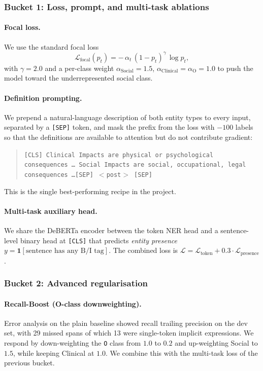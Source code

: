 \documentclass[11pt]{article}
\begin{document}
\subsubsection{Bucket 1: Loss, prompt, and multi-task ablations}

\paragraph{Focal loss.} We use the standard focal loss
\citep{lin2017focal}
\[
\mathcal{L}_{\text{focal}}(p_t) = -\,\alpha_t\,(1 - p_t)^{\gamma}\,\log p_t,
\]
with $\gamma = 2.0$ and a per-class weight $\alpha_{\text{Social}} = 1.5$,
$\alpha_{\text{Clinical}} = \alpha_{\text{O}} = 1.0$ to push the model
toward the underrepresented social class.

\paragraph{Definition prompting.} We prepend a natural-language
description of both entity types to every input, separated by a
\texttt{[SEP]} token, and mask the prefix from the loss with
$-100$ labels so that the definitions are available to attention but do
not contribute gradient:
\begin{quote}\small
\texttt{[CLS] Clinical Impacts are physical or psychological consequences \ldots
Social Impacts are social, occupational, legal consequences \ldots [SEP]
$<$post$>$ [SEP]}
\end{quote}
This is the single best-performing recipe in the project.

\paragraph{Multi-task auxiliary head.} We share the DeBERTa encoder
between the token NER head and a sentence-level binary head at
\texttt{[CLS]} that predicts \emph{entity presence}
$y = \mathbf{1}[\text{sentence has any B/I tag}]$. The combined loss is
$\mathcal{L} = \mathcal{L}_{\text{token}} +
0.3\cdot\mathcal{L}_{\text{presence}}$.

\subsubsection{Bucket 2: Advanced regularisation}

\paragraph{Recall-Boost (O-class downweighting).} Error analysis on the
plain baseline showed recall trailing precision on the dev set, with 29
missed spans of which 13 were single-token implicit expressions. We
respond by down-weighting the \texttt{O} class from $1.0$ to $0.2$ and
up-weighting Social to $1.5$, while keeping Clinical at $1.0$. We
combine this with the multi-task loss of the previous bucket.
\end{document}
